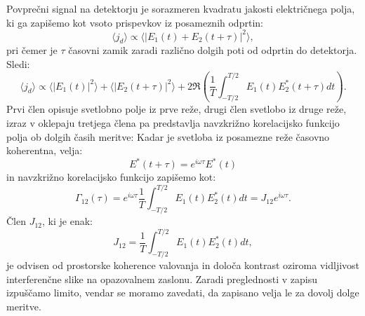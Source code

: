 Povprečni signal na detektorju je sorazmeren kvadratu jakosti električnega polja, ki ga zapišemo
kot vsoto prispevkov iz posameznih odprtin:
\begin{equation}
\langle j_d \rangle \propto \langle|E_1(t)+ E_2(t+\tau)|^2 \rangle,
\label{eq:08_34}
\end{equation}
pri čemer je  $\tau$ časovni zamik zaradi različno dolgih poti od
odprtin do detektorja. Sledi:
\begin{equation}
\langle j_d \rangle \propto \langle|E_1(t)|^2 \rangle + \langle|E_2(t+\tau)|^2 \rangle
+ 2\Re \left( \frac{1}{T}\int_{-T/2}^{T/2}E_1(t)E_2^*(t+\tau) dt \right)\!\!.
\label{eq:08_35}
\end{equation}
Prvi člen opisuje svetlobno polje iz prve reže, drugi člen svetlobo iz druge reže, 
izraz v oklepaju tretjega člena pa predstavlja navzkrižno korelacijsko funkcijo polja ob dolgih
časih meritve:
Kadar je svetloba iz 
posamezne reže časovno koherentna, velja:
\begin{equation}
E^*(t+\tau) = e^{i \omega \tau} E^*(t)
\label{eq:08_36}
\end{equation}
in navzkrižno korelacijsko funkcijo zapišemo kot:
\begin{equation}
\Gamma_{12}(\tau) = e^{i \omega \tau} \frac{1}{T}\int_{-T/2}^{T/2}E_1(t)E_2^*(t) dt =
 J_{12} e^{i \omega \tau}. 
 \label{eq:08_37}
\end{equation}
Člen $J_{12}$, ki je enak:
\begin{equation}
J_{12} = \frac{1}{T}\int_{-T/2}^{T/2}E_1(t)E_2^*(t) dt,
\label{eq:08_38}
\end{equation}
je odvisen od prostorske koherence valovanja in določa kontrast
oziroma vidljivost interferenčne slike
na opazovalnem zaslonu. Zaradi preglednosti v zapisu izpuščamo limito, vendar se moramo zavedati, 
da zapisano velja le za dovolj dolge meritve.

